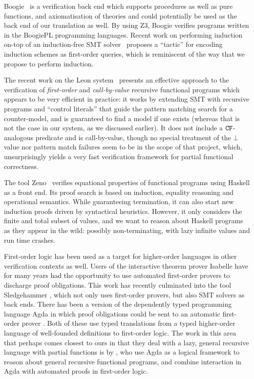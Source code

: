 Boogie~\cite{boogie} is a verification back end which supports procedures as well as
pure functions, and axiomatisation of theories and could potentially be used as the
back end of our translation as well. By using Z3, Boogie verifies
programs written in the BoogiePL programming languages. Recent work on performing induction on-top of an
induction-free SMT solver~\cite{Leino:2012:AIS:2189257.2189278} proposes a ``tactic''
for encoding induction schemes as first-order queries, which is reminiscent of the way
that we propose to perform induction.

The recent work on the Leon system~\cite{Suter:2011:SMR:2041552.2041575} presents
an effective approach to the verification of {\em first-order} and {\em call-by-value}
recursive functional programs which appears to be very efficient in practice: it works
by extending SMT with recursive programs and ``control literals'' that guide the pattern
matching search for a counter-model, and is guaranteed to find a model if one exists
(whereas that is not the case in our system, as we discussed earlier). It does not include
a ${\tt CF}$-analogous predicate and is call-by-value, though no special treatment of the $\bot$
value nor pattern match failures seem to be in the scope of that project, which, unsurprisingly
yields a very fast verification framework for partial functional correctness.

The tool Zeno~\cite{zeno} verifies equational properties of functional
programs using Haskell as a front end. Its proof search is based on
induction, equality reasoning and operational semantics. While
guaranteeing termination, it can also start new induction proofs
driven by syntactical heuristics. However, it only considers the finite and total
subset of values, and we want to reason about Haskell
programs as they appear in the wild: possibly non-terminating, with
lazy infinite values and run time crashes.


First-order logic has been used as a target for higher-order languages in other verification contexts as well.
Users of the interactive theorem prover Isabelle have for many years had the opportunity to use
automated first-order provers to discharge proof obligations. This work has recently culminated into the tool
Sledgehammer \cite{Sledgehammer}, which not only uses first-order provers, but also SMT solvers as back ends.
There has been a version of the dependently typed programming language Agda in which
proof obligations could be sent to an automatic first-order prover \cite{AgdaFOL}. Both of these use typed translations from a typed higher-order language of well-founded definitions to first-order logic. The work in this area that perhaps comes closest to ours in that they deal with a lazy, general recursive language with partial functions is by \citet{TypeTheoryFOL}, who use Agda as a logical framework to reason about general recursive functional programs, and combine interaction in Agda with automated proofs in first-order logic.

